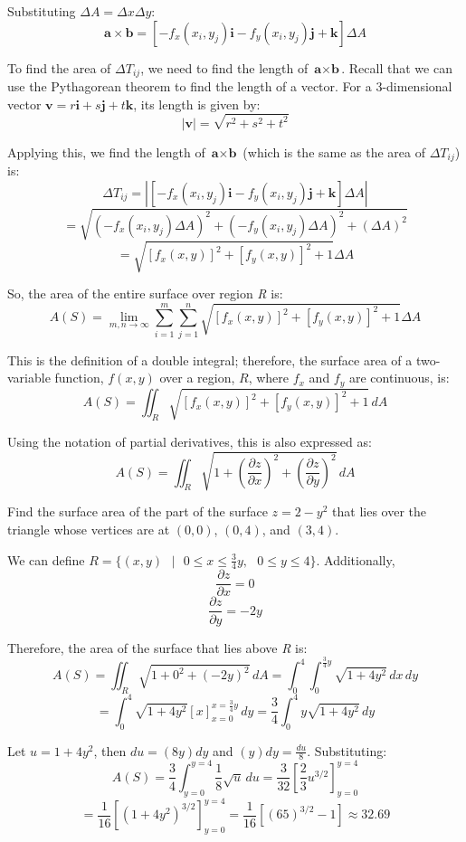 Substituting $\Delta A = \Delta x \Delta y$:
$$\textbf{a} \times \textbf{b} = \left[ -f_x(x_i, y_j) \textbf{i} - f_y(x_i, 
y_j) \textbf{j} + \textbf{k} \right] \Delta A$$

To find the area of $\Delta T_{ij}$, we need to find the length of $\textbf{a} 
\times \textbf{b}$. Recall that we can use the Pythagorean theorem to find the 
length of a vector. For a 3-dimensional vector $\textbf{v} = r \textbf{i} + s 
\textbf{j} + t \textbf{k}$, its length is given by:
$$|\textbf{v}| = \sqrt{r^2 + s^2 + t^2}$$

Applying this, we find the length of $\textbf{a} \times \textbf{b}$ (which is 
the same as the area of $\Delta T_{ij}$) is:
$$\Delta T_{ij} = |\left[ -f_x(x_i, y_j) \textbf{i} - f_y(x_i, y_j) \textbf{j} 
+ \textbf{k} \right] \Delta A|$$
$$= \sqrt{\left(-f_x(x_i, y_j) \Delta A \right)^2 + \left( - f_y(x_i, y_j) 
\Delta A \right)^2 + \left( \Delta A \right)^2}$$
$$= \sqrt{\left[ f_x(x, y)\right]^2 + \left[f_y(x, y) \right]^2 + 1} \Delta A$$

So, the area of the entire surface over region \textit{R} is:
$$A(S) = \lim_{m, n \to \infty} \sum_{i = 1}^m \sum_{j = 1}^n \sqrt{\left[ f_x(
x, y)\right]^2 + \left[f_y(x, y) \right]^2 + 1} \Delta A$$

This is the definition of a double integral; therefore, the surface area of 
a two-variable function, $f(x, y)$ over a region, $R$, where $f_x$ and $f_y$ 
are continuous, is:
$$A(S) = \iint_{\textit{R}} \sqrt{\left[ f_x(x, y)\right]^2 + \left[f_y(x, y) 
\right]^2 + 1}\,dA$$

Using the notation of partial derivatives, this is also expressed as:
$$A(S) = \iint_{\textit{R}} \sqrt{1 + \left( \frac{\partial z}{\partial x} 
\right)^2 + \left( \frac{\partial z}{\partial y} \right)^2}\,dA$$

\begin{Worked}
\begin{Problem}
Find the surface area of the part of the surface $z = 2 -
y^2$ that lies over the triangle whose vertices are at $(0, 0)$, $(0, 4)$, and 
$(3, 4)$. 
\end{Problem}
\begin{Solution}
We can define $\textit{R} = \{(x, y)\text{ }|\text{ }0 \leq
x \leq \frac{3}{4}y,\text{ }0 \leq y \leq 4\}$. Additionally, 
$$\frac{\partial z}{\partial x} = 0$$
$$\frac{\partial z}{\partial y} = -2y$$

Therefore, the area of the surface that lies above \textit{R} is:
$$A(S) = \iint_{\textit{R}} \sqrt{1 + 0^2 + \left( -2y \right)^2}\,dA = 
\int_0^4 \int_0^{\frac{3}{4}y} \sqrt{1 + 4y^2}\,dx\,dy$$
$$= \int_0^4 \sqrt{1 + 4y^2} \left[ x \right]_{x = 0}^{x = \frac{3}{4}y}\,dy 
= \frac{3}{4} \int_0^4 y \sqrt{1 + 4y^2}\,dy$$

Let $u = 1 + 4y^2$, then $du = (8y)dy$ and $(y)dy = \frac{du}{8}$. Substituting:
$$A(S) = \frac{3}{4} \int_{y = 0}^{y = 4} \frac{1}{8} \sqrt{u}\,du = \frac{3}{
32} \left[ \frac{2}{3} u^{3/2} \right]_{y = 0}^{y = 4}$$
$$= \frac{1}{16} \left[ \left(1 + 4y^2 \right)^{3/2} \right]_{y = 0}^{y = 4} = 
\frac{1}{16} \left[ \left( 65 \right)^{3/2} - 1 \right] \approx 32.69$$
\end{Solution}
\end{Worked}

